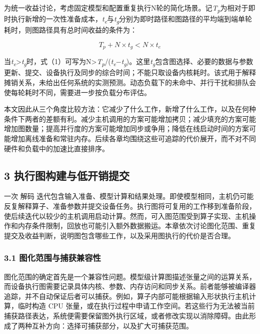\documentclass[UTF8,11pt,fontset=windows]{ctexart}
\begin{document}
为统一收益讨论，考虑固定模型和配置重复执行N轮的简化场景。记\emph{T\textsubscript{p}}为相对于即时执行新增的一次性准备成本，\emph{t\textsubscript{e}}与\emph{t\textsubscript{g}}分别为即时路径和图路径的平均端到端单轮耗时，则图路径具有总时间收益的条件为：

\hypertarget{equation-1}{}
\begin{equation}T_p+N\times t_g<N\times t_e\tag{1}\end{equation}

当\emph{t\textsubscript{e}}\textgreater{}\emph{t\textsubscript{g}}时，式（1）可写为N\textgreater{}\emph{T\textsubscript{p}}/(\emph{t\textsubscript{e}}−\emph{t\textsubscript{g}})。这里\emph{t\textsubscript{g}}包含图选择、必要的数据与参数更新、提交、设备执行及同步的综合时间；不能只取设备内核耗时。该式用于解释摊销关系，未给出任何系统的实测预测。动态负载下的未命中、并行干扰和排队会使每轮耗时不同，需要进一步按负载分布评估。

本文因此从三个角度比较方法：它减少了什么工作，新增了什么工作，以及在何种条件下两者的差额有利。减少主机调用的方案可能增加拷贝；减少填充的方案可能增加图数量；提高并行度的方案可能增加同步或争用；降低在线启动时间的方案可能增加离线准备和常驻内存。后续各章均围绕这些可追踪的代价展开，而不对不同硬件和负载中的加速比直接排序。

\hypertarget{section-3}{%
\subsection{\texorpdfstring{\textbf{3 执行图构建与低开销提交}}{3 执行图构建与低开销提交}}\label{section-3}}

一次 解码 迭代包含输入准备、模型计算和结果处理。即使模型相同，主机仍可能反复解释算子、准备参数并提交设备任务。执行图将可复用的工作移到准备阶段，使后续迭代以较少的主机调用启动计算。然而，可入图范围受到算子实现、主机操作和内存条件限制，回放也可能引入额外数据搬运。本章依次讨论图化范围、重复提交及收益判断，说明图包含哪些工作，以及采用图执行的代价是否合理。

\hypertarget{section-3-1}{%
\subsubsection{\texorpdfstring{\textbf{3.1 图化范围与捕获兼容性}}{3.1 图化范围与捕获兼容性}}\label{section-3-1}}

图化范围的确定首先是一个兼容性问题。模型级计算图描述张量之间的运算关系，而设备执行图需要记录具体内核、参数、内存访问和同步关系。前者能够被编译器追踪，并不自动保证后者可以捕获。例如，算子内部可能根据输入形状执行主机计算，临时构造 CPU 张量，或在执行过程中申请工作空间。若这些行为无法被当前捕获路径表达，系统便需要保留图外执行区域，或者修改实现以消除障碍。由此形成了两种互补方向：选择可捕获部分，以及扩大可捕获范围。
\end{document}
